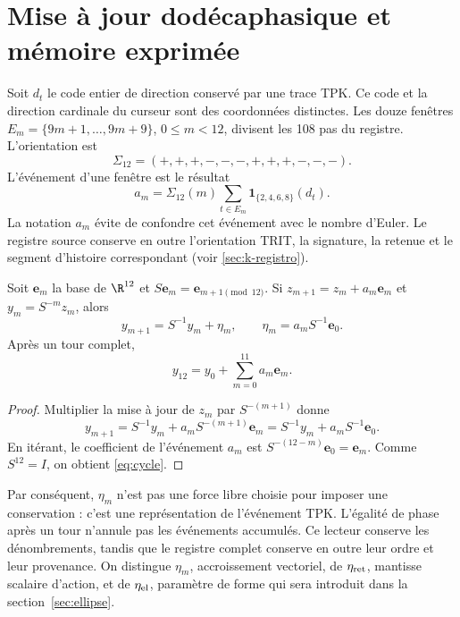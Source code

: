 \section{Mise à jour dodécaphasique et mémoire exprimée}
\label{sec:eta}
Soit $d_t$ le code entier de direction conservé par une trace TPK. Ce code et la direction cardinale du curseur sont des coordonnées distinctes. Les douze fenêtres $E_m=\{9m+1,\ldots,9m+9\}$, $0\le m<12$, divisent les 108 pas du registre. L'orientation est
\[
\Sigma_{12}=(+,+,+,-,-,-,+,+,+,-,-,-).
\]
L'événement d'une fenêtre est le résultat
\begin{equation}
a_m=\Sigma_{12}(m)
\sum_{t\in E_m}\mathbf1_{\{2,4,6,8\}}(d_t).
\label{eq:events}
\end{equation}
La notation $a_m$ évite de confondre cet événement avec le nombre d’Euler.
Le registre source conserve en outre l’orientation TRIT, la signature,
la retenue et le segment d’histoire correspondant (voir \ref{sec:k-registro}).

\begin{proposition}
Soit $\mathbf e_m$ la base de $\R^{12}$ et
$S\mathbf e_m=\mathbf e_{m+1\pmod{12}}$. Si
$z_{m+1}=z_m+a_m\mathbf e_m$ et $y_m=S^{-m}z_m$, alors
\begin{equation}
y_{m+1}=S^{-1}y_m+\eta_m,
\qquad
\eta_m=a_mS^{-1}\mathbf e_0.
\label{eq:eta}
\end{equation}
Après un tour complet,
\begin{equation}
y_{12}=y_0+\sum_{m=0}^{11}a_m\mathbf e_m.
\label{eq:cycle}
\end{equation}
\end{proposition}
\begin{proof}
Multiplier la mise à jour de $z_m$ par $S^{-(m+1)}$ donne
\[
y_{m+1}=S^{-1}y_m+a_mS^{-(m+1)}\mathbf e_m
=S^{-1}y_m+a_mS^{-1}\mathbf e_0.
\]
En itérant, le coefficient de l’événement $a_m$ est
$S^{-(12-m)}\mathbf e_0=\mathbf e_m$. Comme $S^{12}=I$,
on obtient \eqref{eq:cycle}.
\end{proof}

Par conséquent, $\eta_m$ n’est pas une force libre choisie pour imposer une
conservation : c’est une représentation de l’événement TPK. L’égalité de phase
après un tour n’annule pas les événements accumulés. Ce lecteur
conserve les dénombrements, tandis que le registre complet conserve en outre leur
ordre et leur provenance. On distingue $\eta_m$, accroissement vectoriel, de
$\eta_{\rm ret}$, mantisse scalaire d’action, et de $\eta_{\rm el}$,
paramètre de forme qui sera introduit dans la section~\ref{sec:ellipse}.

